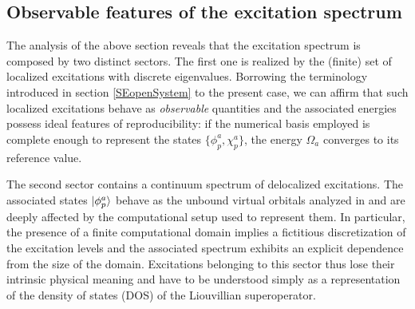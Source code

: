 \documentclass[reprint,aps,prb]{revtex4-1}
\begin{document}
\subsection{Observable features of the excitation spectrum}

The analysis of the above section reveals that the excitation spectrum is composed by two distinct sectors.
The first one is realized by the (finite) set of localized excitations with discrete eigenvalues.
Borrowing the terminology introduced in section \ref{SEopenSystem} to the present case, we can affirm that such localized excitations behave as
\emph{observable} quantities and the associated energies possess ideal features of reproducibility:
if the numerical basis employed is complete enough to
represent the states $\{\phi_p^a,\chi_p^a\}$, the energy $\Omega_a$
converges to its reference value.

The second sector contains a continuum spectrum of delocalized excitations. The associated states $\ket{\phi_p^a}$ behave as the unbound virtual orbitals analyzed in \cite{boffi2016}
and are deeply affected by the computational setup used to represent them. In particular, the presence of a finite computational domain implies a fictitious discretization of the excitation levels and
the associated spectrum exhibits an explicit dependence from the size of the domain.
Excitations belonging to this sector thus lose their intrinsic physical meaning and have to be understood simply as
a representation of the density of states (DOS) of the Liouvillian superoperator.
\end{document}
